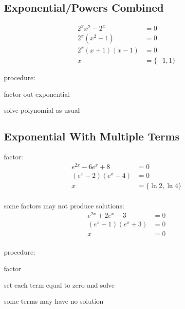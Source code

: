 \documentclass{exam}
\begin{document}
  \subsection{Exponential/Powers Combined}
  \begin{align*}
    2^x x^2 - 2^x &= 0 \\
    2^x \left( x^2 - 1 \right) &= 0 \\
    2^x (x + 1)(x - 1) &= 0 \\
    x &= \{ -1, 1 \}
  \end{align*}

  procedure:
  \begin{itemize*}
    \item factor out exponential
    \item solve polynomial as usual
  \end{itemize*}

  \subsection{Exponential With Multiple Terms}
  factor:
  \begin{align*}
    e^{2x} - 6e^x + 8  &= 0 \\
    (e^x - 2)(e^x - 4) &= 0 \\
    x                  &= \{ \ln 2, \ln 4 \} \\
  \end{align*}

  some factors may not produce solutions:
  \begin{align*}
    e^{2x} + 2e^x - 3  &= 0 \\
    (e^x - 1)(e^x + 3) &= 0 \\
    x                  &= 0 \\
  \end{align*}

  procedure:
  \begin{itemize*}
    \item factor 
    \item set each term equal to zero and solve
    \item some terms may have no solution
  \end{itemize*}
\end{document}
